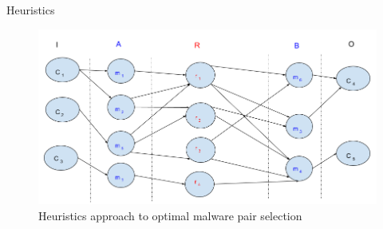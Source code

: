 \documentclass{beamer}
\begin{document}
\begin{frame}[plain]{Heuristics}
\begin{figure}[H]
  \centering
  \includegraphics[scale=0.3]{figures/dhkheuristics.png}
  \caption[]{Heuristics approach to optimal malware pair selection}\label{fig:dhkheuristics}
  \centering
\end{figure}
\end{frame}
\end{document}

